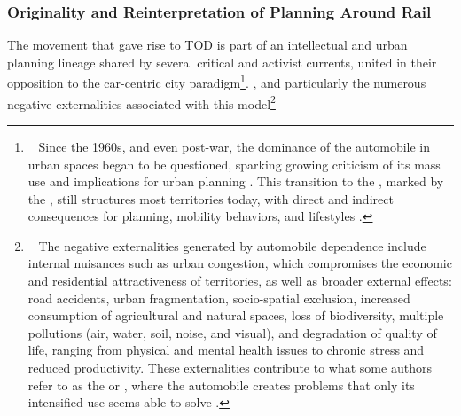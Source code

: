 \begin{refsegment}
\subsubsection*{Originality and Reinterpretation of Planning Around Rail
    \label{chap1:tod-presentation-generale-origines-originalite}
    }

The movement that gave rise to \acrshort{TOD} is part of an intellectual and urban planning lineage shared by several critical and activist currents, united in their opposition to the car-centric city paradigm\footnote{~
    Since the 1960s, and even post-war, the dominance of the automobile in urban spaces began to be questioned, sparking growing criticism of its mass use and implications for urban planning \textcolor{blue}{\autocites{jacobs_death_1961}{illich_energie_1973}}. This transition to the  \textcolor{blue}{\autocite[4]{newman_land_1996}}, marked by the  \textcolor{blue}{\autocite[157]{urry_social_2003}}, still structures most territories today, with direct and indirect consequences for planning, mobility behaviors, and lifestyles \textcolor{blue}{\autocite[40]{sebban_complementarite_2003}}.
}. \textcolor{blue}{\autocites{jacobs_death_1961}{illich_energie_1973}}, and particularly the numerous negative externalities associated with this model\footnote{~
    The negative externalities generated by automobile dependence include internal nuisances such as urban congestion, which compromises the economic and residential attractiveness of territories, as well as broader external effects: road accidents, urban fragmentation, socio-spatial exclusion, increased consumption of agricultural and natural spaces, loss of biodiversity, multiple pollutions (air, water, soil, noise, and visual), and degradation of quality of life, ranging from physical and mental health issues to chronic stress and reduced productivity. These externalities contribute to what some authors refer to as the  or , where the automobile creates problems that only its intensified use seems able to solve \textcolor{blue}{\autocites[62]{cervero_transit_1998}[4]{heran_reduction_2001}[2]{heran_zones_2009}}.
}
\end{refsegment}
